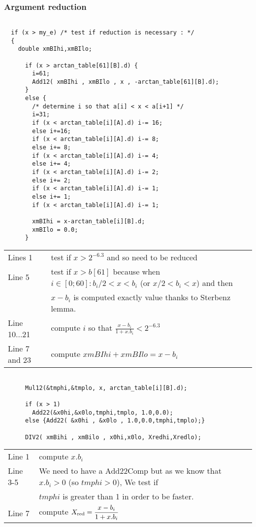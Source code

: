 \subsubsection{Argument reduction}
\begin{lstlisting}[caption={Reduction},firstnumber=1]

  if (x > my_e) /* test if reduction is necessary : */ 
  {
    double xmBIhi,xmBIlo;      

      if (x > arctan_table[61][B].d) {
        i=61;
        Add12( xmBIhi , xmBIlo , x , -arctan_table[61][B].d);
      }
      else {
        /* determine i so that a[i] < x < a[i+1] */
        i=31;
        if (x < arctan_table[i][A].d) i-= 16;
        else i+=16;
        if (x < arctan_table[i][A].d) i-= 8;
        else i+= 8;
        if (x < arctan_table[i][A].d) i-= 4;
        else i+= 4;
        if (x < arctan_table[i][A].d) i-= 2;
        else i+= 2;
        if (x < arctan_table[i][A].d) i-= 1;
        else i+= 1;
        if (x < arctan_table[i][A].d) i-= 1;
          
        xmBIhi = x-arctan_table[i][B].d;
        xmBIlo = 0.0;
      }
\end{lstlisting}

\begin{tabular}{ll}
Lines  1 & test if $x > 2^{-6.3}$ and so need to be reduced\\
Line 5 & test if $x>b[61]$ because when $i \in [0;60] : b_i/2 < x <
b_i$ (or $ x/2 < b_i < x$) and then \\&$x-b_i$ is computed exactly
value thanks to Sterbenz lemma.\\
Line 10...21 & compute $i$ so that $\frac{x-b_i}{1+x.b_i} < 2^{-6.3} $\\
Line 7 and 23 & compute $xmBIhi + xmBIlo = x - b_i$

\end{tabular}

\begin{lstlisting}[caption={Reduction : 2nd part},firstnumber=1]

      Mul12(&tmphi,&tmplo, x, arctan_table[i][B].d);

      if (x > 1)
        Add22(&x0hi,&x0lo,tmphi,tmplo, 1.0,0.0);
      else {Add22( &x0hi , &x0lo , 1.0,0.0,tmphi,tmplo);}

      DIV2( xmBihi , xmBilo , x0hi,x0lo, Xredhi,Xredlo);

\end{lstlisting}
\begin{tabular}{ll}
Line 1 & compute $x.b_i$\\
Line 3-5 & We need to have a Add22Comp but as we know that $x.b_i > 0$ (so
$tmphi>0$), We test if\\& $tmphi$ is greater than 1 in order to be
faster.\\
Line 7 & compute $X_{\mathrm{red}} = \dfrac{x-b_i}{1+x.b_i}$
\end{tabular}
\bigskip
